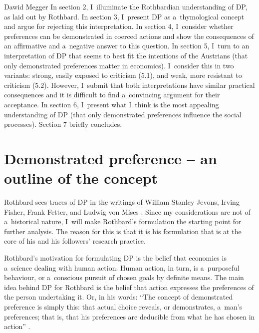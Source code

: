 \begin{artengenv}{Dawid Megger}
In section 2, I~illuminate the Rothbardian understanding of DP, as laid out by Rothbard. In section 3, I~present DP as a~thymological concept and argue for rejecting this interpretation. In section 4, I~consider whether preferences can be demonstrated in coerced actions and show the consequences of an affirmative and a~negative answer to this question. In section 5, I~turn to an interpretation of DP that seems to best fit the intentions of the Austrians (that only demonstrated preferences matter in economics). I~consider this in two variants: strong, easily exposed to criticism (5.1), and weak, more resistant to criticism (5.2). However, I~submit that both interpretations have similar practical consequences and it is difficult to find a~convincing argument for their acceptance. In section 6, I~present what I~think is the most appealing understanding of DP (that only demonstrated preferences influence the social processes). Section 7 briefly concludes.



\section{Demonstrated preference -- an outline of the concept}

Rothbard sees traces of DP in the writings of William Stanley Jevons, Irving Fisher, Frank Fetter, and Ludwig von Mises 
\parencite[][p.290]{rothbard_present_2011}. %
 Since my considerations are not of a~historical nature, I~will make Rothbard's formulation the starting point for further analysis. The reason for this is that it is his formulation that is at the core of his and his followers' research practice.



Rothbard's motivation for formulating DP is the belief that economics is a~science dealing with human action. Human action, in turn, is a~purposeful behaviour, or a~conscious pursuit of chosen goals by definite means. The main idea behind DP for Rothbard is the belief that action expresses the preferences of the person undertaking it. Or, in his words: ``The concept of demonstrated preference is simply this: that actual choice reveals, or demonstrates, a~man's preferences; that is, that his preferences are deducible from what he has chosen in action'' 
\parencite[][p.290]{rothbard_present_2011}.%





\end{artengenv}
